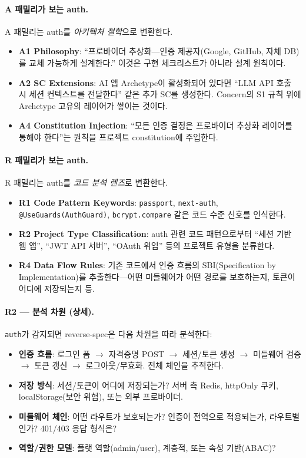 \documentclass[11pt,a4paper,openright,twoside]{report}
\begin{document}
\paragraph{A 패밀리가 보는 auth.}
A 패밀리는 auth를 \emph{아키텍처 철학}으로 변환한다.
\begin{itemize}
  \item \textbf{A1 Philosophy}: ``프로바이더 추상화---인증 제공자(Google, GitHub, 자체 DB)를 교체 가능하게 설계한다.'' 이것은 구현 체크리스트가 아니라 설계 원칙이다.
  \item \textbf{A2 SC Extensions}: AI 앱 Archetype이 활성화되어 있다면 ``LLM API 호출 시 세션 컨텍스트를 전달한다'' 같은 추가 SC를 생성한다. Concern의 S1 규칙 위에 Archetype 고유의 레이어가 쌓이는 것이다.
  \item \textbf{A4 Constitution Injection}: ``모든 인증 결정은 프로바이더 추상화 레이어를 통해야 한다''는 원칙을 프로젝트 constitution에 주입한다.
\end{itemize}

\paragraph{R 패밀리가 보는 auth.}
R 패밀리는 auth를 \emph{코드 분석 렌즈}로 변환한다.
\begin{itemize}
  \item \textbf{R1 Code Pattern Keywords}: \texttt{passport}, \texttt{next-auth}, \texttt{@UseGuards(AuthGuard)}, \texttt{bcrypt.compare} 같은 코드 수준 신호를 인식한다.
  \item \textbf{R2 Project Type Classification}: auth 관련 코드 패턴으로부터 ``세션 기반 웹 앱'', ``JWT API 서버'', ``OAuth 위임'' 등의 프로젝트 유형을 분류한다.
  \item \textbf{R4 Data Flow Rules}: 기존 코드에서 인증 흐름의 SBI(Specification by Implementation)를 추출한다---어떤 미들웨어가 어떤 경로를 보호하는지, 토큰이 어디에 저장되는지 등.
\end{itemize}

\paragraph{R2 --- 분석 차원 (상세).}
\texttt{auth}가 감지되면 reverse-spec은 다음 차원을 따라 분석한다:

\begin{itemize}[nosep]
  \item \textbf{인증 흐름}: 로그인 폼 $\rightarrow$ 자격증명 POST $\rightarrow$ 세션/토큰 생성 $\rightarrow$ 미들웨어 검증 $\rightarrow$ 토큰 갱신 $\rightarrow$ 로그아웃/무효화. 전체 체인을 추적한다.
  \item \textbf{저장 방식}: 세션/토큰이 어디에 저장되는가? 서버 측 Redis, httpOnly 쿠키, localStorage(보안 위험), 또는 외부 프로바이더.
  \item \textbf{미들웨어 체인}: 어떤 라우트가 보호되는가? 인증이 전역으로 적용되는가, 라우트별인가? 401/403 응답 형식은?
  \item \textbf{역할/권한 모델}: 플랫 역할(admin/user), 계층적, 또는 속성 기반(ABAC)?
\end{itemize}
\end{document}
